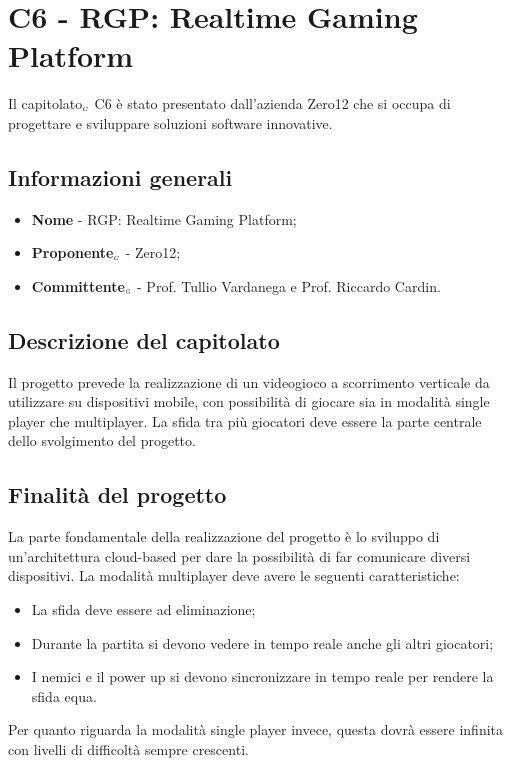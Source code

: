 \chapter{C6 - RGP: Realtime Gaming Platform} \label{CapitolatoC6}
Il capitolato$_{\scaleto{G}{3pt}}$ C6 è stato presentato dall'azienda Zero12 che si occupa di progettare e sviluppare soluzioni software innovative. 
\section{Informazioni generali} \label{C6InformazioniGenerali}
\begin{itemize}
	\item \textbf{Nome} - RGP: Realtime Gaming Platform;
	\item \textbf{Proponente}$_{\scaleto{G}{3pt}}$ - Zero12;
	\item \textbf{Committente}$_{\scaleto{G}{3pt}}$ - Prof. Tullio Vardanega e Prof. Riccardo Cardin.
\end{itemize}
\section{Descrizione del capitolato} \label{C6DescrizioneDelCapitolato}
Il progetto prevede la realizzazione di un videogioco a scorrimento verticale da utilizzare su dispositivi mobile, con possibilità di giocare sia in modalità single player che multiplayer. La sfida tra più giocatori deve essere la parte centrale dello svolgimento del progetto.
\section{Finalità del progetto} \label{C6FinalitàDelProgetto}
La parte fondamentale della realizzazione del progetto è lo sviluppo di un'architettura cloud-based  per dare la possibilità di far comunicare diversi dispositivi. La modalità multiplayer deve avere le seguenti caratteristiche:
\begin{itemize}
	\item La sfida deve essere ad eliminazione;
	\item Durante la partita si devono vedere in tempo reale anche gli altri giocatori;
	\item I nemici e il power up si devono sincronizzare in tempo reale per rendere la sfida equa.
\end{itemize}
Per quanto riguarda la modalità single player invece, questa dovrà essere infinita con livelli di difficoltà sempre crescenti.
